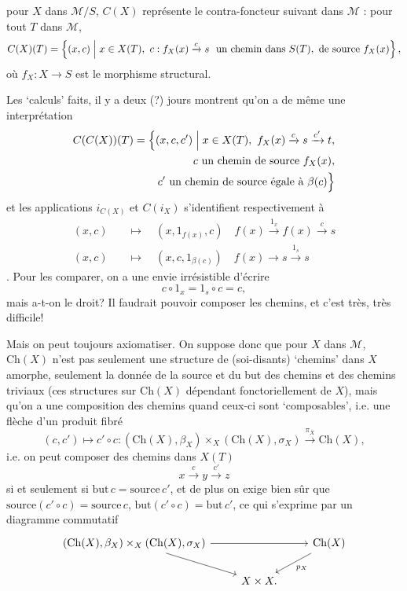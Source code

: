 \documentclass[11pt]{article}
\newcommand{\printedpage}[1]{\marginpar{\footnotesize p.~#1}}
\newcommand{\msp}[1]{\marginpar{\footnotesize [#1]}}
\newcommand{\Ch}{\mathrm{Ch}}
\begin{document}
\printedpage{66}

\msp{page 105}
pour $X$ dans $\mathcal{M}/S$, $C(X)$ représente le contra-foncteur suivant dans $\mathcal{M}$ : pour tout $T$ dans $\mathcal{M}$,
\[
C(X)(T)=\Bigl\{(x,c)\Bigm| x\in X(T),\ c : f_X(x)\xrightarrow{c}s\ \text{ un chemin dans } S(T), \text{ de source } f_X(x)\Bigr\}\,,
\]
où $f_X : X\longrightarrow S$ est le morphisme structural.

Les ‘calculs’ faits, il y a deux (?) jours montrent qu'on a de même une interprétation
\[
\begin{aligned}
C(C(X))(T)=\Bigl\{(x,c,c')\Bigm| x\in X(T),\ f_X(x)\xrightarrow{c}s\xrightarrow{c'}t,\\
c\text{ un chemin de source } f_X(x),\\
c'\text{ un chemin de source égale à } \beta(c)\Bigr\}
\end{aligned}
\]
et les applications $i_{C(X)}$ et $C(i_X)$ s'identifient respectivement à
\[
\begin{aligned}
(x,c)\quad&\longmapsto\quad(x,1_{f(x)},c)\quad f(x)\xrightarrow{1_x}f(x)\xrightarrow{c}s\\
(x,c)\quad&\longmapsto\quad(x,c,1_{\beta(c)})\quad f(x)\longrightarrow s\xrightarrow{1_s}s
\end{aligned}
\]
. Pour les comparer, on a une envie irrésistible d'écrire
\[
c\circ 1_x=1_s\circ c=c,
\]
mais a-t-on le droit? Il faudrait pouvoir composer les chemins, et c'est très, très difficile!

Mais on peut toujours axiomatiser. On suppose donc que pour $X$ dans $\mathcal{M}$, $\Ch(X)$
\msp{page 106}
n'est pas seulement une structure de (soi-disants) ‘chemins’ dans $X$ amorphe, seulement la donnée de la source et du but des chemins et des chemins triviaux (ces structures sur $\Ch(X)$ dépendant fonctoriellement de $X$), mais qu'on a une composition des chemins quand ceux-ci sont ‘composables’, i.e. une flèche d'un produit fibré
\[
(c,c')\longmapsto c'\circ c : (\Ch(X),\beta_X)\times_X(\Ch(X),\sigma_X)\xrightarrow{\pi_X}\Ch(X),
\]
i.e. on peut composer des chemins dans $X(T)$
\[
x\xrightarrow{c}y\xrightarrow{c'}z
\]
si et seulement si $\text{but}\,c=\text{source}\,c'$, et de plus on exige bien sûr que $\text{source}(c'\circ c)=\text{source}\,c$, $\text{but}(c'\circ c)=\text{but}\,c'$, ce qui s'exprime par un diagramme commutatif
\[
\begin{tikzcd}
(\Ch(X),\beta_X)\times_X(\Ch(X),\sigma_X) \arrow[rr] \arrow[dr] & & \Ch(X) \arrow[dl, "p_X"] \\
 & X\times X. &
\end{tikzcd}
\]
\end{document}
